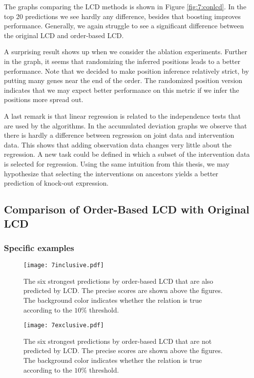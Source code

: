 The graphs comparing the LCD methods is shown in Figure \ref{fig:7:conlcd}. In the top 20 predictions we see hardly any difference, besides that boosting improves performance. Generally, we again struggle to see a significant difference between the original LCD and order-based LCD. 

A surprising result shows up when we consider the ablation experiments. Further in the graph, it seems that randomizing the inferred positions leads to a better performance. Note that we decided to make position inference relatively strict, by putting many genes near the end of the order. The randomized position version indicates that we may expect better performance on this metric if we infer the positions more spread out. 

A last remark is that linear regression is related to the independence tests that are used by the algorithms. In the accumulated deviation graphs we observe that there is hardly a difference between regression on joint data and intervention data. This shows that adding observation data changes very little about the regression. A new task could be defined in which a subset of the intervention data is selected for regression. Using the same intuition from this thesis, we may hypothesize that selecting the interventions on ancestors yields a better prediction of knock-out expression.



\subsection{Comparison of Order-Based LCD with Original LCD}

\subsubsection{Specific examples}


\begin{figure}[p]
    \centering
    \texttt{[image: 7inclusive.pdf]}
    \caption{The six strongest predictions by order-based LCD that are also predicted by LCD. The precise scores are shown above the figures. The background color indicates whether the relation is true according to the $10\%$ threshold.}
    \label{fig:7:exincl}
\end{figure}

\begin{figure}[p]
    \centering
    \texttt{[image: 7exclusive.pdf]}
    \caption{The six strongest predictions by order-based LCD that are not predicted by LCD. The precise scores are shown above the figures. The background color indicates whether the relation is true according to the $10\%$ threshold.}
    \label{fig:7:exexcl}
\end{figure}

